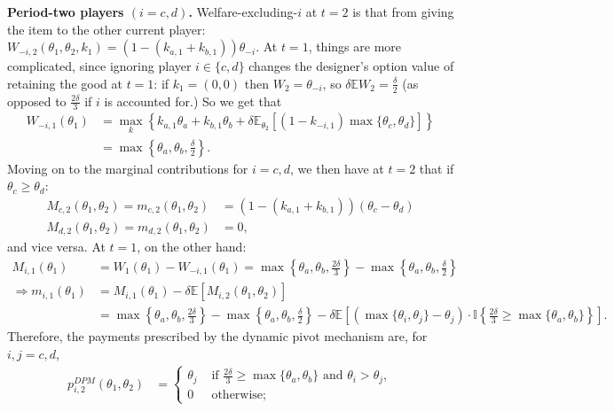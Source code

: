 \documentclass[a4paper]{article}
\begin{document}
\begin{enumerate}
		\textbf{Period-two players $(i=c,d)$.}
		Welfare-excluding-$i$ at $t=2$ is that from giving the item to the other current player: $W_{-i,2} (\theta_1,\theta_2,k_1) = (1-(k_{a,1}+k_{b,1})) \theta_{-i}$. At $t=1$, things are more complicated, since ignoring player $i \in \{c,d\}$ changes the designer's option value of retaining the good at $t=1$: if $k_1 = (0,0)$ then $W_2 = \theta_{-i}$, so $\delta \mathbb{E} W_2 = \frac{\delta}{2}$ (as opposed to $\frac{2\delta}{3}$ if $i$ is accounted for.) So we get that 
		\begin{align*}
			W_{-i,1}(\theta_1) &= \max_k \left\{ k_{a,1} \theta_a + k_{b,1} \theta_b + \delta \mathbb{E}_{\theta_2} \left[(1-k_{-i,1}) \max \{\theta_c,\theta_d\} \right] \right\}
			\\
			&= \max \left\{ \theta_a, \theta_b, \frac{\delta}{2} \right\}.
		\end{align*}
		Moving on to the marginal contributions for $i=c,d$, we then have at $t=2$ that if $\theta_c \geq \theta_d$: 
		\begin{align*}
			M_{c,2}(\theta_1,\theta_2) = m_{c,2}(\theta_1,\theta_2) &= (1-(k_{a,1}+k_{b,1}))(\theta_c - \theta_d)
			\\
			M_{d,2}(\theta_1,\theta_2) = m_{d,2}(\theta_1,\theta_2) &= 0,
		\end{align*}
		and vice versa. At $t=1$, on the other hand:
		\begin{align*} 
			M_{i,1} (\theta_1) &= W_1(\theta_1) - W_{-i,1}(\theta_1) = \max \left\{ \theta_a, \theta_b, \frac{2\delta}{3} \right\} -  \max \left\{ \theta_a, \theta_b, \frac{\delta}{2} \right\}
			\\
			\Rightarrow
			m_{i,1} (\theta_1) &= M_{i,1} (\theta_1) - \delta \mathbb{E} [M_{i,2}(\theta_1,\theta_2) ] 
			\\
			&= \max \left\{ \theta_a, \theta_b, \frac{2\delta}{3} \right\} -  \max \left\{ \theta_a, \theta_b, \frac{\delta}{2} \right\} - \delta \mathbb{E} \left[ (\max\{\theta_i,\theta_j\} - \theta_j) \cdot \mathbb{I}\left\{ \frac{2\delta}{3} \geq \max\{ \theta_a,\theta_b\} \right\} \right].
		\end{align*}
		Therefore, the payments prescribed by the dynamic pivot mechanism are, for $i,j=c,d$,
		\begin{align*}
			p^{DPM}_{i,2} (\theta_1,\theta_2) &= \begin{cases}
				\theta_j & \text{ if } \frac{2\delta}{3} \geq \max\{ \theta_a,\theta_b\} \text{ and } \theta_i > \theta_j,
				\\
				0 & \text{ otherwise};

\end{cases}
\end{align*}
\end{enumerate}
\end{document}
